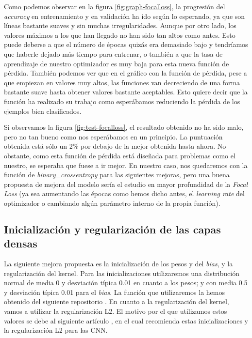 \documentclass[11pt,a4paper]{article}
\begin{document}
Como podemos observar en la figura \ref{fig:graph-focalloss}, la progresión del \textit{accuracy} en entrenamiento y
en validación ha ido según lo esperando, ya que son líneas bastante suaves y sin muchas irregularidades.
Aunque por otro lado, los valores máximos a los que han llegado no han sido tan altos como antes. Esto puede deberse
a que el número de épocas quizás era demasiado bajo y tendríamos que haberle dejado más tiempo para entrenar, o también
a que la tasa de aprendizaje de nuestro optimizador es muy baja para esta nueva función de pérdida. También podemos
ver que en el gráfico con la función de pérdida, pese a que empiezan en valores muy altos, las funciones van
decreciendo de una forma bastante suave hasta obtener valores bastante aceptables. Esto quiere decir que la función
ha realizado su trabajo como esperábamos reduciendo la pérdida de los ejemplos bien clasificados.

Si observamos la figura \ref{fig:test-focalloss}, el resultado obtenido no ha sido malo, pero no tan bueno como nos
esperábamos en un principio. La puntuación obtenida está sólo un 2\% por debajo de la mejor obtenida hasta ahora.
No obstante, como esta función de pérdida está diseñada para problemas como el nuestro, se esperaba que fuese a ir
mejor. En nuestro caso, nos quedaremos con la función de \textit{binary\_crossentropy} para las siguientes mejoras,
pero una buena propuesta de mejora del modelo sería el estudio en mayor profundidad de la \textit{Focal Loss} (ya sea
aumentando las épocas como hemos dicho antes, el \textit{learning rate} del optimizador o cambiando algún parámetro
interno de la propia función).

\subsection{Inicialización y regularización de las capas densas}

La siguiente mejora propuesta es la inicialización de los pesos y del \textit{bias}, y la regularización del kernel.
Para las inicializaciones utilizaremos una distribución normal de media 0 y desviación típica 0.01 en cuanto a los
pesos; y con media 0.5 y desviación típica 0.01 para el \textit{bias}. La función que utilizaremos la hemos obtenido
del siguiente repositorio \cite{initializers}. En cuanto a la regularización del kernel, vamos a utilizar la 
regularización L2. El motivo por el que utilizamos estos valores se debe al siguiente artículo \cite{msc-thesis}, en
el cual recomienda estas inicializaciones y la regularización L2 para las CNN.
\end{document}
